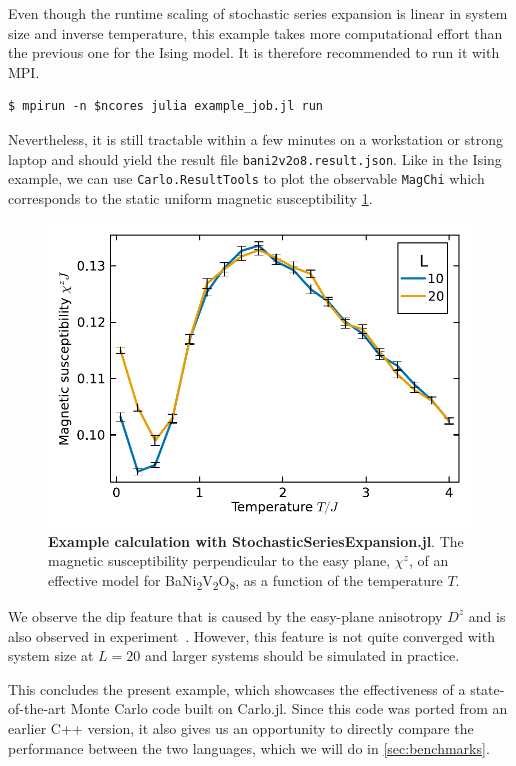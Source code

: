 \documentclass{SciPost}
\newcommand\banivo{BaNi\textsubscript{2}V\textsubscript{2}O\textsubscript{8}}
\begin{document}
Even though the runtime scaling of stochastic series expansion is linear in system size and inverse temperature, this example takes more computational effort than the previous one for the Ising model. It is therefore recommended to run it with MPI.
\begin{lstlisting}
$ mpirun -n $ncores julia example_job.jl run
\end{lstlisting}
Nevertheless, it is still tractable within a few minutes on a workstation or strong laptop and should yield the result file \texttt{bani2v2o8.result.json}. Like in the Ising example, we can use \texttt{Carlo.ResultTools} to plot the observable \texttt{MagChi} which corresponds to the static uniform magnetic susceptibility \cref{fig:susceptibility}.
\begin{figure}
\begin{center}
\includegraphics[scale=0.625]{figs/bani2v2o8.pdf}
\end{center}
\caption{\textbf{Example calculation with StochasticSeriesExpansion.jl}. The magnetic susceptibility perpendicular to the easy plane, $\chi^z$, of an effective model for \banivo, as a function of the temperature $T$.}
\label{fig:susceptibility}
\end{figure}

We observe the dip feature that is caused by the easy-plane anisotropy $D^z$ and is also observed in experiment~\cite{Klyushina2021}. However, this feature is not quite converged with system size at $L=20$ and larger systems should be simulated in practice.

This concludes the present example, which showcases the effectiveness of a state-of-the-art Monte Carlo code built on Carlo.jl. Since this code was ported from an earlier C++ version, it also gives us an opportunity to directly compare the performance between the two languages, which we will do in \cref{sec:benchmarks}.
\end{document}
